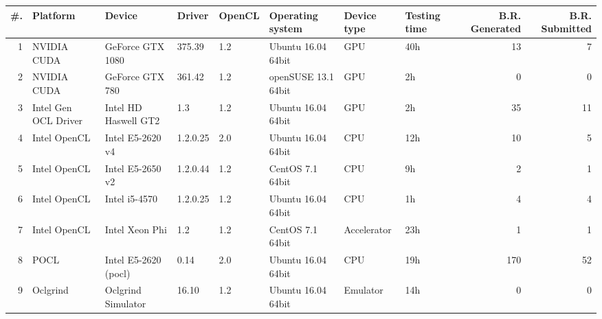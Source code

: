 \begin{tabular}{rlllllllrr}
\toprule
 \#. &              Platform &                Device &    Driver & OpenCL &      Operating system &  Device type & Testing time &  B.R. Generated &  B.R. Submitted \\
\midrule
  1 &           NVIDIA CUDA &      GeForce GTX 1080 &    375.39 &    1.2 &    Ubuntu 16.04 64bit &          GPU &          40h &              13 &               7 \\
  2 &           NVIDIA CUDA &       GeForce GTX 780 &    361.42 &    1.2 &  openSUSE  13.1 64bit &          GPU &           2h &               0 &               0 \\
  3 &  Intel Gen OCL Driver &  Intel HD Haswell GT2 &       1.3 &    1.2 &    Ubuntu 16.04 64bit &          GPU &           2h &              35 &              11 \\
  4 &          Intel OpenCL &      Intel E5-2620 v4 &  1.2.0.25 &    2.0 &    Ubuntu 16.04 64bit &          CPU &          12h &              10 &               5 \\
  5 &          Intel OpenCL &      Intel E5-2650 v2 &  1.2.0.44 &    1.2 &      CentOS 7.1 64bit &          CPU &           9h &               2 &               1 \\
  6 &          Intel OpenCL &         Intel i5-4570 &  1.2.0.25 &    1.2 &    Ubuntu 16.04 64bit &          CPU &           1h &               4 &               4 \\
  7 &          Intel OpenCL &        Intel Xeon Phi &       1.2 &    1.2 &      CentOS 7.1 64bit &  Accelerator &          23h &               1 &               1 \\
  8 &                  POCL &  Intel E5-2620 (pocl) &      0.14 &    2.0 &    Ubuntu 16.04 64bit &          CPU &          19h &             170 &              52 \\
  9 &              Oclgrind &    Oclgrind Simulator &     16.10 &    1.2 &    Ubuntu 16.04 64bit &     Emulator &          14h &               0 &               0 \\
\bottomrule
\end{tabular}
